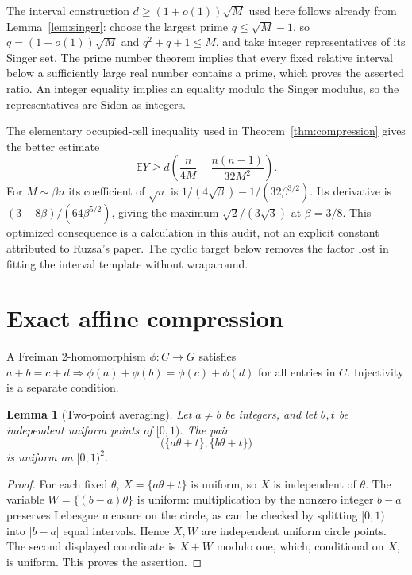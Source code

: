 \documentclass[11pt]{article}
\newtheorem{lemma}[theorem]{Lemma}
\theoremstyle{definition}
\theoremstyle{remark}
\newcommand{\E}{\mathbb E}
\begin{document}
The interval construction $d\ge(1+o(1))\sqrt M$ used here follows
already from Lemma~\ref{lem:singer}: choose the largest prime
$q\le\sqrt M-1$, so $q=(1+o(1))\sqrt M$ and $q^2+q+1\le M$,
and take integer representatives of its Singer set. The prime number
theorem implies that every fixed relative interval below a sufficiently
large real number contains a prime, which proves the asserted ratio.
An integer equality
implies an equality modulo the Singer modulus, so the representatives
are Sidon as integers.

The elementary occupied-cell inequality used in
Theorem~\ref{thm:compression} gives the better estimate
\[
\E Y\ge d\left(\frac n{4M}-\frac{n(n-1)}{32M^2}\right).
\]
For $M\sim\beta n$ its coefficient of $\sqrt n$ is
$1/(4\sqrt\beta)-1/(32\beta^{3/2})$.
Its derivative is $(3-8\beta)/(64\beta^{5/2})$, giving the maximum
$\sqrt2/(3\sqrt3)$ at $\beta=3/8$.
This optimized consequence is a calculation in this audit, not an
explicit constant attributed to Ruzsa's paper. The cyclic target below
removes the factor lost in fitting the interval template without wraparound.

\section{Exact affine compression}

A Freiman $2$-homomorphism $\phi:C\to G$ satisfies
$a+b=c+d\Rightarrow\phi(a)+\phi(b)=\phi(c)+\phi(d)$ for all entries
in $C$. Injectivity is a separate condition.

\begin{lemma}[Two-point averaging]\label{lem:pair}
Let $a\ne b$ be integers, and let $\theta,t$ be independent uniform
points of $[0,1)$. The pair
\[
\bigl(\{a\theta+t\},\{b\theta+t\}\bigr)
\]
is uniform on $[0,1)^2$.
\end{lemma}
\begin{proof}
For each fixed $\theta$, $X=\{a\theta+t\}$ is uniform, so $X$ is
independent of $\theta$. The variable $W=\{(b-a)\theta\}$ is uniform:
multiplication by the nonzero integer $b-a$ preserves Lebesgue measure
on the circle, as can be checked by splitting $[0,1)$ into $|b-a|$
equal intervals. Hence $X,W$ are independent uniform circle points.
The second displayed coordinate is $X+W$ modulo one, which, conditional
on $X$, is uniform. This proves the assertion.
\end{proof}
\end{document}
